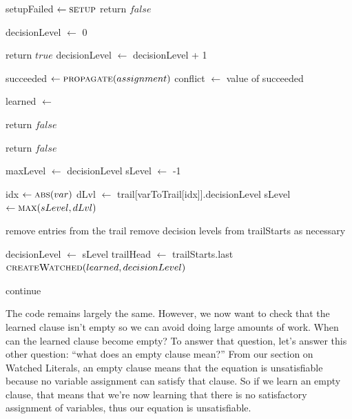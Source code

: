 \begin{algorithm}[H]
\caption{CDCL with Backjumping}\label{alg:32}
\begin{algorithmic}[1]

\State setupFailed $\gets \Call{setup}{}$
    return $false$
\EndIf

\State decisionLevel $\gets$ 0

        \State return $true$
    \Else 
        \State decisionLevel $\gets$ decisionLevel + 1
    \EndIf

    \State succeeded $\gets \Call{propagate}{assignment}$
        \State conflict $\gets$ value of succeeded

        \State learned $\gets$ 

            \State return $false$
        \EndIf

            \State return $false$
        \EndIf

        \State maxLevel $\gets$ decisionLevel
        \State sLevel $\gets$ -1

            \State idx $\gets \Call{abs}{var}$
            \State dLvl $\gets$ trail[varToTrail[idx]].decisionLevel
                \State sLevel $\gets \Call{max}{sLevel, dLvl}$
            \EndIf
        \EndFor

            \State remove entries from the trail
            \State remove decision levels from trailStarts as necessary
        \EndWhile

        \State decisionLevel $\gets$ sLevel
        \State trailHead $\gets$ trailStarts.last
        \State $\Call{createWatched}{learned, decisionLevel}$

        \State continue
    \EndIf
\EndWhile

\EndProcedure
\end{algorithmic}
\end{algorithm}

The code remains largely the same. However, we now want to check that the learned clause isn't empty
so we can avoid doing large amounts of work. When can the learned clause become empty? To answer 
that question, let's answer this other question: ``what does an empty clause mean?'' From our 
section on Watched Literals, an empty clause means that the equation is unsatisfiable because 
no variable assignment can satisfy that clause. So if we learn an empty clause, that means that 
we're now learning that there is no satisfactory assignment of variables, thus our equation is 
unsatisfiable.

